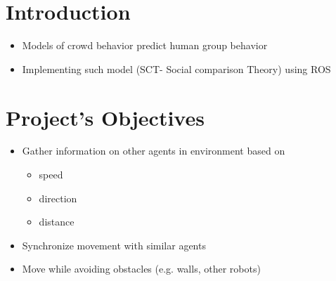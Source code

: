 \documentclass[a0,portrait]{a0poster}
\begin{document}
\begin{multicols}{2} %






  \color{Black} %
  \section*{Introduction}
  \begin{itemize}
  \item Models of crowd behavior predict human group behavior
  \item Implementing such model (SCT- Social comparison Theory) using ROS
  \end{itemize}



  \color{Black} %
  \section*{Project's Objectives}
  \begin{itemize}
  \item Gather information on other agents in environment based on
    \begin{itemize}
    \item speed
    \item direction
    \item distance
    \end{itemize}
  \item Synchronize movement with similar agents
  \item Move while avoiding obstacles (e.g. walls, other robots)
  \end{itemize}


\end{multicols}
\end{document}
